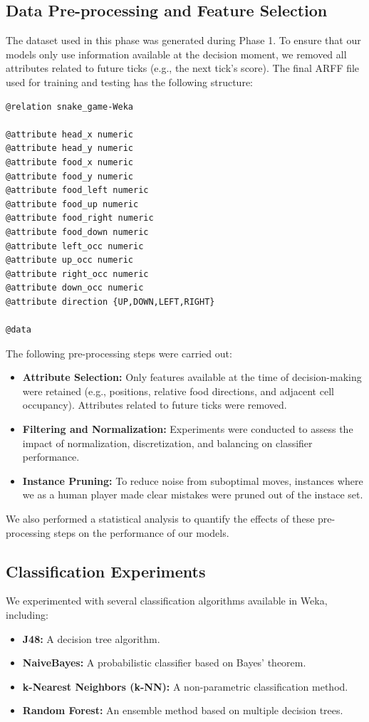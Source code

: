 \documentclass[12pt,a4paper]{article}
\begin{document}
\subsection{Data Pre-processing and Feature Selection}

The dataset used in this phase was generated during Phase 1. To ensure that our models only use information available at the decision moment, we removed all attributes related to future ticks (e.g., the next tick's score). The final ARFF file used for training and testing has the following structure:

\begin{verbatim}
@relation snake_game-Weka

@attribute head_x numeric
@attribute head_y numeric
@attribute food_x numeric
@attribute food_y numeric
@attribute food_left numeric
@attribute food_up numeric
@attribute food_right numeric
@attribute food_down numeric
@attribute left_occ numeric
@attribute up_occ numeric
@attribute right_occ numeric
@attribute down_occ numeric
@attribute direction {UP,DOWN,LEFT,RIGHT}

@data
\end{verbatim}


The following pre-processing steps were carried out:
\begin{itemize}
    \item \textbf{Attribute Selection:} Only features available at the time of decision-making were retained (e.g., positions, relative food directions, and adjacent cell occupancy). Attributes related to future ticks were removed.
    \item \textbf{Filtering and Normalization:} Experiments were conducted to assess the impact of normalization, discretization, and balancing on classifier performance.
    \item \textbf{Instance Pruning:} To reduce noise from suboptimal moves, instances where we as a human player made clear mistakes were pruned out of the instace set.
\end{itemize}

We also performed a statistical analysis to quantify the effects of these pre-processing steps on the performance of our models.

\subsection{Classification Experiments}
We experimented with several classification algorithms available in Weka, including:
\begin{itemize}
    \item \textbf{J48:} A decision tree algorithm.
    \item \textbf{NaiveBayes:} A probabilistic classifier based on Bayes' theorem.
    \item \textbf{k-Nearest Neighbors (k-NN):} A non-parametric classification method.
    \item \textbf{Random Forest:} An ensemble method based on multiple decision trees.
\end{itemize}
\end{document}
